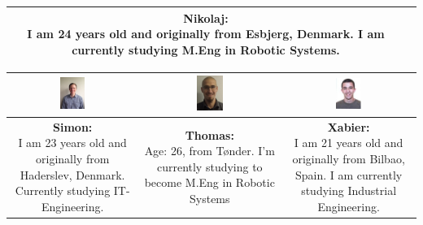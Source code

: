 \begin{table}[h]
\begin{tabular}{|c|c|c|c|}
&

\parbox[t] {0.2\textwidth}{
\textbf{Nikolaj:} \\
I am 24 years old and originally from Esbjerg, Denmark. I am currently studying M.Eng in Robotic Systems.
} 

\\\hline
\end{tabular}

\begin{tabular}{|c|c|c|}
\hline
\includegraphics[width=0.2\textwidth]{graphics/Simon_profile} & %
\includegraphics[width=0.2\textwidth]{graphics/Thomas_profile} & %
\includegraphics[width=0.2\textwidth]{graphics/sexy_xabi_profile} \\ \hline %
\parbox[t] {0.2\textwidth}{
\textbf{Simon:} \\
I am 23 years old and originally from Haderslev, Denmark. Currently studying IT-Engineering.

} 

&

\parbox[t] {0.2\textwidth}{
\textbf{Thomas:} \\
Age: 26, from Tønder. I'm currently studying to become M.Eng in Robotic Systems
} 

&

\parbox[t] {0.2\textwidth}{
\textbf{Xabier:} \\
I am 21 years old and originally from Bilbao, Spain. I am currently studying Industrial Engineering.
} 

\\\hline
\end{tabular}
\end{table}



